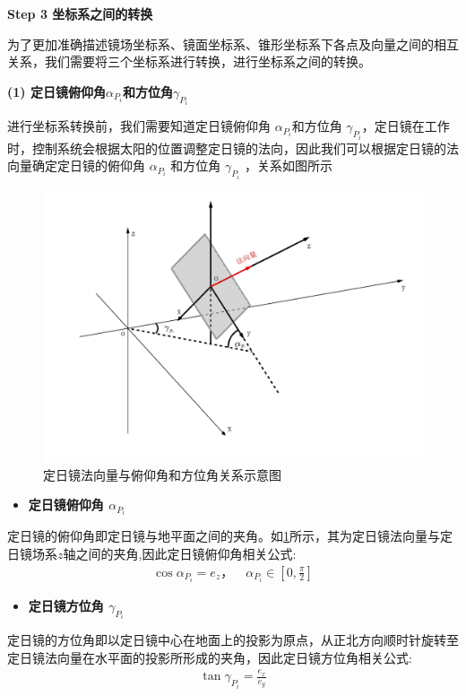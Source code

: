 \documentclass[../main.tex]{subfiles}
\begin{document}
  \noindent \textbf{Step 3 坐标系之间的转换}
\par 为了更加准确描述镜场坐标系、镜面坐标系、锥形坐标系下各点及向量之间的相互关系，我们需要将三个坐标系进行转换，进行坐标系之间的转换。
\par \textbf{(1) 定日镜俯仰角$\alpha_{P_{i}}$和方位角$\gamma_{P_{i}}$}

\par 进行坐标系转换前，我们需要知道定日镜俯仰角 $\alpha_{P_{i}}$和方位角 $\gamma_{P_{i}}$，定日镜在工作时，控制系统会根据太阳的位置调整定日镜的法向，因此我们可以根据定日镜的法向量确定定日镜的俯仰角 $\alpha_{P_{i}}$ 和方位角 $\gamma_{P_{i}}$ ，关系如图所示
   \begin{figure}[H]
    \centering
    \includegraphics[width=.8\textwidth]{4}
    \caption{定日镜法向量与俯仰角和方位角关系示意图}
    \label{1.12}
\end{figure} 


\begin{itemize}
\item \textbf{定日镜俯仰角 $\alpha_{P_{i}}$ }
\end{itemize}
\par 定日镜的俯仰角即定日镜与地平面之间的夹角。如\cref{1.12}所示，其为定日镜法向量与定日镜场系$z$轴之间的夹角,因此定日镜俯仰角相关公式:
\begin{align}    \label{1.13}
\cos\alpha_{P_i} = e_z，\quad \alpha_{P_{i}} \in [0, \frac{\pi}{2}]
\end{align}

\begin{itemize}
  \item \textbf{定日镜方位角 $\gamma_{P_{i}}$  }
  \end{itemize}
  \par 定日镜的方位角即以定日镜中心在地面上的投影为原点，从正北方向顺时针旋转至定日镜法向量在水平面的投影所形成的夹角，因此定日镜方位角相关公式:
    \begin{align}    \label{1.14}
\tan\gamma_{P_i} = \frac{e_{x}}{e_{y}}
\end{align}               
\end{document}

